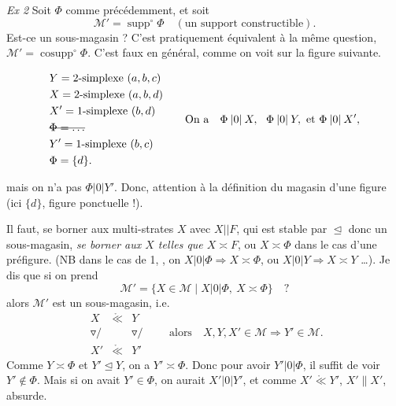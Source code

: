 \documentclass[11pt,a4paper]{article}
\begin{document}
\textit{Ex 2} Soit $\Phi$ comme précédemment, et soit
\[
  \mathcal{M}'=\operatorname{supp}^{\circ}\Phi \quad(\text{un support constructible}).
\]
Est-ce un sous-magasin ? C'est pratiquement équivalent à la même question,  $\mathcal{M}'=\operatorname{cosupp}^{\circ}\Phi$. \struck{\ill{} \ill{}, \ill{}} C'est faux en général, comme on voit sur la figure suivante.

\[
  \begin{aligned}
    &Y=\text{2-simplexe }(a,b,c)\\
    &X=\text{2-simplexe }(a,b,d)\\
    &X'=\text{1-simplexe }(b,d)\\
    &\text{\struck{$\Phi=\ldots$}}\\
    &Y'=\text{1-simplexe }(b,c)\\
    &\Phi=\{d\}.
  \end{aligned}
  \qquad
  \text{On a}\quad \Phi\mathbin{|0|}X,\ \ \Phi\mathbin{|0|}Y,\ \text{et}\ \Phi\mathbin{|0|}X',
\]

mais on n'a pas $\Phi\mathbin{|0|}Y'$. Donc, attention à la définition du magasin  d'une figure  (ici $\{d\}$, figure ponctuelle !).

Il faut,   se borner aux multi-strates $X$ avec $X\mathbin{||}F$, qui est stable par $\trianglelefteq$ donc un sous-magasin, \textit{se borner aux $X$ telles que $X\asymp F$}, ou $X\asymp\Phi$ dans le cas d'une préfigure. (NB dans le cas de  1,  \ill{}, on  $X\mathbin{|0|}\Phi\Rightarrow X\asymp\Phi$, ou $X\mathbin{|0|}Y\Rightarrow X\asymp Y$ …). Je dis  que si on prend
\[
  \mathcal{M}'=\{X\in\mathcal{M}\mid X\mathbin{|0|}\Phi,\ X\asymp\Phi\} \quad ?
\]
alors $\mathcal{M}'$ est un sous-magasin, i.e.
\[
  \begin{array}{ccc}
    X & \mathring{\ll} & Y\\
    \triangledown\!\!/ & & \triangledown\!\!/\\
    X' & \mathring{\ll} & Y'
  \end{array}
  \qquad \text{alors}\quad X,Y,X'\in\mathcal{M}\Rightarrow Y'\in\mathcal{M}.
\]
Comme $Y\asymp\Phi$ et $Y'\trianglelefteq Y$, on a $Y'\asymp\Phi$. Donc pour avoir $Y'\mathbin{|0|}\Phi$, il suffit de voir $Y'\notin\Phi$. Mais si on avait $Y'\in\Phi$, on aurait $X'\mathbin{|0|}Y'$,
et comme $X'\mathbin{\mathring{\ll}}Y'$, $X'\mathbin{\|}X'$, absurde.
\end{document}
